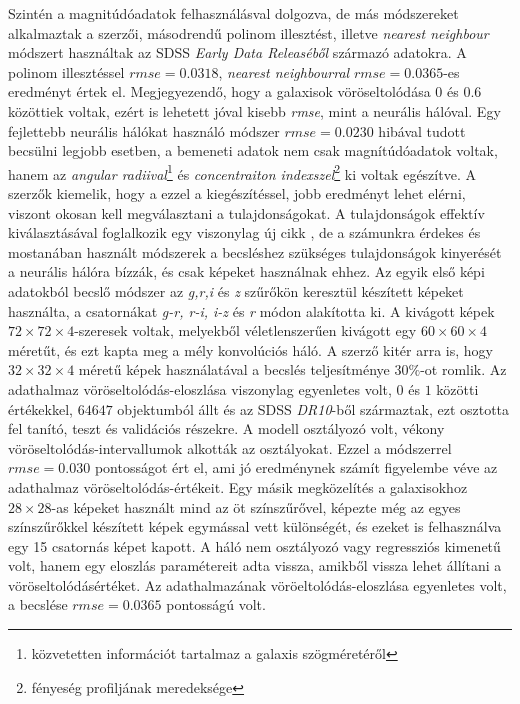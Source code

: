 \documentclass[12pt,letterpaper,oneside,openright]{book}
\begin{document}
 Szintén a magnitúdóadatok felhasználásval dolgozva, de más módszereket alkalmaztak a \cite{app_photoz} szerzői, másodrendű polinom illesztést, illetve \textit{nearest neighbour} módszert használtak az SDSS \textit{Early Data Releaséből} származó adatokra. A polinom illesztéssel $\textit{rmse} = 0.0318$, \textit{nearest neighbourral} $\textit{rmse} = 0.0365$-es eredményt értek el. Megjegyezendő, hogy a galaxisok vöröseltolódása $0$ és $0.6$ közöttiek voltak, ezért is lehetett jóval kisebb \textit{rmse}, mint a neurális hálóval.
 \newline \indent
 Egy fejlettebb neurális hálókat használó módszer \cite{mlrsone} $\textit{rmse} = 0.0230$ hibával tudott becsülni legjobb esetben, a bemeneti adatok nem csak magnítúdóadatok voltak, hanem az \textit{angular radiival}\footnote{közvetetten információt tartalmaz a galaxis szögméretéről} és \textit{concentraiton indexszel}\footnote{fényeség profiljának meredeksége} ki voltak egészítve. A szerzők kiemelik, hogy a ezzel a kiegészítéssel, jobb eredményt lehet elérni, viszont okosan kell megválasztani a tulajdonságokat. A tulajdonságok effektív kiválasztásával foglalkozik egy viszonylag új cikk \cite{fes}, de a számunkra érdekes és mostanában használt módszerek a becsléshez szükséges tulajdonságok kinyerését a neurális hálóra bízzák, és csak képeket használnak ehhez. 
 \newline \indent
 Az egyik első képi adatokból becslő módszer \cite{benh} az \textit{g,r,i} és \textit{z} szűrőkön keresztül készített képeket használta, a csatornákat \textit{g-r, r-i, i-z }és \textit{r} módon alakította ki. A kivágott képek $72\times 72\times 4$-szeresek voltak, melyekből véletlenszerűen kivágott egy $60\times 60 \times 4$ méretűt, és ezt kapta meg a mély konvolúciós háló. A szerző kitér arra is, hogy $32\times32\times 4$ méretű képek használatával a becslés teljesítménye $30\%$-ot romlik. Az adathalmaz vöröseltolódás-eloszlása viszonylag egyenletes volt, $0$ és $1$ közötti értékekkel, $\num{64647}$ objektumból állt és az SDSS \textit{DR10}-ből származtak, ezt osztotta fel tanító, teszt és validációs részekre. A modell osztályozó volt, vékony vöröseltolódás-intervallumok alkották az osztályokat. Ezzel a módszerrel  $\textit{rmse} = 0.030$ pontosságot ért el, ami jó eredménynek számít figyelembe véve az adathalmaz vöröseltolódás-értékeit.
 \newline\indent
 Egy másik megközelítés \cite{dast} a galaxisokhoz $28\times 28$-as képeket használt mind az öt színszűrővel, képezte még az egyes színszűrőkkel készített képek egymással vett különségét, és ezeket is felhasználva egy 15 csatornás képet kapott. A háló nem osztályozó vagy regressziós kimenetű volt, hanem egy eloszlás paramétereit adta vissza, amikből vissza lehet állítani a vöröseltolódásértéket. Az adathalmazának vöröeltolódás-eloszlása egyenletes volt, a becslése $\textit{rmse} =0.0365$ pontosságú volt. 
\end{document}
